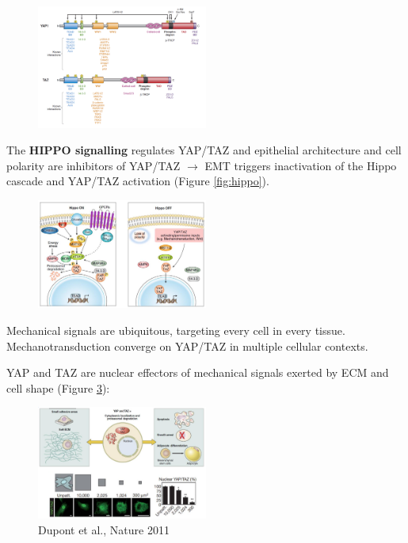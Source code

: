 \begin{figure}
\centering
\includegraphics[width=0.5\textwidth]{../_resources/Screen_Shot_2022-11-13_at_19-40-17.png}
\caption{}
\label{fig:yaptaz}
\end{figure}

The \textbf{HIPPO signalling} regulates YAP/TAZ and epithelial architecture and cell polarity are inhibitors of YAP/TAZ $\rightarrow$ EMT triggers inactivation of the Hippo cascade and YAP/TAZ activation (Figure \ref{fig:hippo}).

\begin{figure}
\centering
\includegraphics[width=0.5\textwidth]{../_resources/Screen_Shot_2022-11-13_at_19-41-35.png}
\caption{}
\label{fig:hipp}
\end{figure}

Mechanical signals are ubiquitous, targeting every cell in every tissue. Mechanotransduction converge on YAP/TAZ in multiple cellular contexts.

YAP and TAZ are nuclear effectors of mechanical signals exerted by ECM and cell shape (Figure \ref{fig:ecm}):

\begin{figure}
\centering
\includegraphics[width=0.5\textwidth]{../_resources/Screen_Shot_2022-11-13_at_19-43-07.png}
\caption{Dupont et al., Nature 2011}
\label{fig:ecm}
\end{figure}


